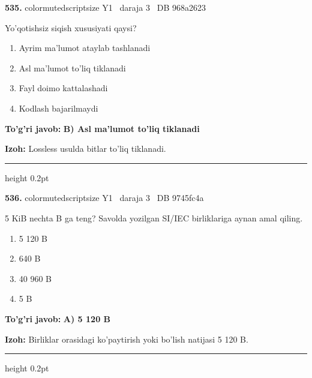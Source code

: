 \documentclass[10pt,a4paper,oneside]{article}
\begin{document}
\noindent\textbf{\color{ink}535.}  {color{muted}scriptsize Y1 \textbullet\ daraja 3 \textbullet\ DB 968a2623}
\par
Yo'qotishsiz siqish xususiyati qaysi?
\begin{enumerate}[label=\Alph*),leftmargin=9mm]
\item Ayrim ma'lumot ataylab tashlanadi
\item Asl ma'lumot to'liq tiklanadi
\item Fayl doimo kattalashadi
\item Kodlash bajarilmaydi
\end{enumerate}
\begin{tcolorbox}[enhanced,breakable,colback=teal!4,colframe=teal!50!black,boxrule=0.5pt,arc=1.1mm,left=3mm,right=3mm,top=1.7mm,bottom=1.7mm,before skip=2mm,after skip=2mm]
\textbf{\color{teal}To'g'ri javob:} \textbf{B) Asl ma'lumot to'liq tiklanadi}
\par\smallskip
\textbf{Izoh:} Lossless usulda bitlar to'liq tiklanadi.
\end{tcolorbox}
\vspace{2mm}\hrule height 0.2pt \vspace{3mm}

\noindent\textbf{\color{ink}536.}  {color{muted}scriptsize Y1 \textbullet\ daraja 3 \textbullet\ DB 9745fc4a}
\par
5 KiB nechta B ga teng? Savolda yozilgan SI/IEC birliklariga aynan amal qiling.
\begin{enumerate}[label=\Alph*),leftmargin=9mm]
\item 5 120 B
\item 640 B
\item 40 960 B
\item 5 B
\end{enumerate}
\begin{tcolorbox}[enhanced,breakable,colback=teal!4,colframe=teal!50!black,boxrule=0.5pt,arc=1.1mm,left=3mm,right=3mm,top=1.7mm,bottom=1.7mm,before skip=2mm,after skip=2mm]
\textbf{\color{teal}To'g'ri javob:} \textbf{A) 5 120 B}
\par\smallskip
\textbf{Izoh:} Birliklar orasidagi ko'paytirish yoki bo'lish natijasi 5 120 B.
\end{tcolorbox}
\vspace{2mm}\hrule height 0.2pt \vspace{3mm}
\end{document}
